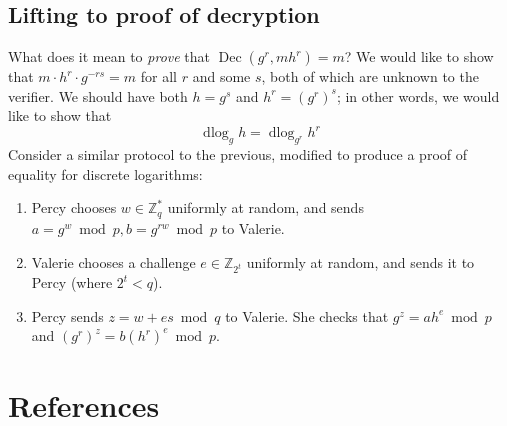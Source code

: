 \documentclass[11pt,twoside,a4paper]{article}
\DeclareMathOperator{\Dec}{Dec}
\DeclareMathOperator{\dlog}{dlog}
\theoremstyle{definition}
\begin{document}
\subsection{Lifting to proof of decryption}
What does it mean to \textit{prove} that \(\Dec(g^r,mh^r)=m\)? We would like to show that \(m\cdot h^r\cdot g^{-rs}=m\) for all \(r\) and some \(s\), both of which are unknown to the verifier. We should have both \(h=g^s\) and \(h^r=(g^r)^s\); in other words, we would like to show that
\[\dlog_g{h}=\dlog_{g^r}{h^r}\]
Consider a similar protocol to the previous, modified to produce a proof of equality for discrete logarithms:
\begin{enumerate}
    \item Percy chooses \(w\in\mathbb{Z}^*_q\) uniformly at random, and sends \(a=g^w\bmod p,b=g^{rw}\bmod p\) to Valerie.
    \item Valerie chooses a challenge \(e\in\mathbb{Z}_{2^t}\) uniformly at random, and sends it to Percy (where \(2^t<q\)).
    \item Percy sends \(z=w+es\bmod q\) to Valerie. She checks that \(g^z=ah^e\bmod p\) and \((g^r)^z=b(h^r)^e\bmod p\).
\end{enumerate}

\section{References}


\end{document}
